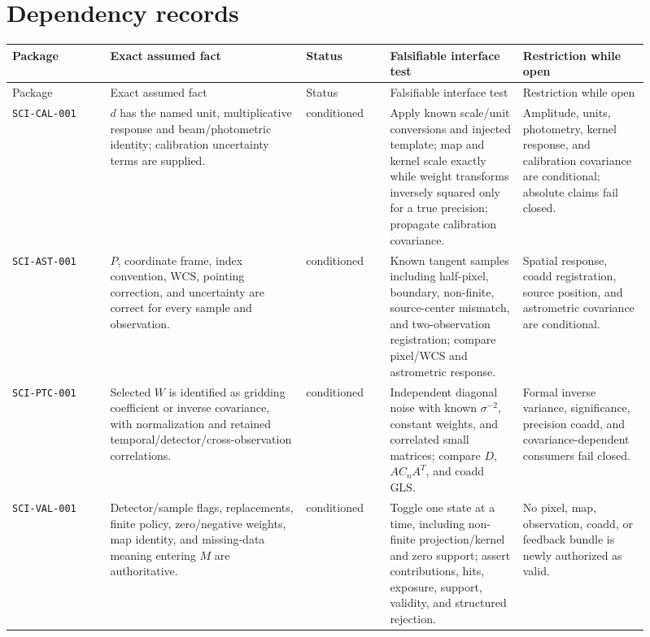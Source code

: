 \documentclass[11pt]{article}
\newcommand{\code}[1]{\nolinkurl{#1}}
\begin{document}
\section{Dependency records}

\begin{longtable}{L{0.14\linewidth}L{0.28\linewidth}L{0.12\linewidth}L{0.19\linewidth}L{0.18\linewidth}}
\toprule
Package & Exact assumed fact & Status & Falsifiable interface test & Restriction while open\\
\midrule
\endfirsthead
\toprule
Package & Exact assumed fact & Status & Falsifiable interface test & Restriction while open\\
\midrule
\endhead
\code{SCI-CAL-001} & \(d\) has the named unit, multiplicative response and
beam/photometric identity; calibration uncertainty terms are supplied. &
conditioned & Apply known scale/unit conversions and injected template; map and
kernel scale exactly while weight transforms inversely squared only for a true
precision; propagate calibration covariance. & Amplitude, units, photometry,
kernel response, and calibration covariance are conditional; absolute claims
fail closed.\\
\code{SCI-AST-001} & \(P\), coordinate frame, index convention, WCS,
pointing correction, and uncertainty are correct for every sample and
observation. & conditioned & Known tangent samples including half-pixel,
boundary, non-finite, source-center mismatch, and two-observation registration;
compare pixel/WCS and astrometric response. & Spatial response, coadd
registration, source position, and astrometric covariance are conditional.\\
\code{SCI-PTC-001} & Selected \(W\) is identified as gridding coefficient or
inverse covariance, with normalization and retained temporal/detector/cross-observation
correlations. & conditioned & Independent diagonal noise with known
\(\sigma^{-2}\), constant weights, and correlated small matrices; compare
\(D\), \(AC_nA^T\), and coadd GLS. & Formal inverse variance, significance,
precision coadd, and covariance-dependent consumers fail closed.\\
\code{SCI-VAL-001} & Detector/sample flags, replacements, finite policy,
zero/negative weights, map identity, and missing-data meaning entering \(M\)
are authoritative. & conditioned & Toggle one state at a time, including
non-finite projection/kernel and zero support; assert contributions, hits,
exposure, support, validity, and structured rejection. & No pixel, map,
observation, coadd, or feedback bundle is newly authorized as valid.\\
\bottomrule
\end{longtable}
\end{document}
